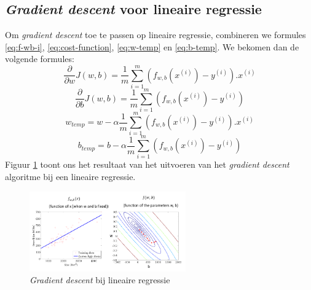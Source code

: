 \subsection{\textit{Gradient descent} voor lineaire regressie}

Om \textit{gradient descent} toe te passen op lineaire regressie, combineren we formules \ref{eq:f-wb-i}, \ref{eq:cost-function}, \ref{eq:w-temp} en \ref{eq:b-temp}. We bekomen dan de volgende formules:
\begin{equation}
	\frac{\partial}{\partial w}J(w, b) = \frac{1}{m}\sum_{i=1}^{m}(f_{w,b}(x^{(i)}) - y^{(i)}) . x^{(i)}
\end{equation}
\begin{equation}
	\frac{\partial}{\partial b}J(w, b) = \frac{1}{m}\sum_{i=1}^{m}(f_{w,b}(x^{(i)}) - y^{(i)})
\end{equation}
\begin{equation}
	w_{temp} = w - \alpha \frac{1}{m}\sum_{i=1}^{m}(f_{w,b}(x^{(i)}) - y^{(i)}) . x^{(i)}
\end{equation}
\begin{equation}
	b_{temp} = b - \alpha \frac{1}{m}\sum_{i=1}^{m}(f_{w,b}(x^{(i)}) - y^{(i)})
\end{equation}
\noindent
Figuur \ref{fig:gradient-descent} toont ons het resultaat van het uitvoeren van het \textit{gradient descent} algoritme bij een lineaire regressie.
\begin{figure}[h]
	\centering
	\includegraphics[width=0.6\textwidth]{images/7-gradient-descent.png}
	\caption{\textit{Gradient descent} bij lineaire regressie}
	\label{fig:gradient-descent}
\end{figure}


